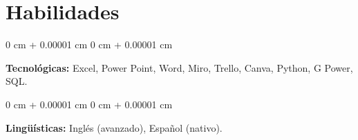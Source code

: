 \documentclass[10pt, letterpaper]{article}
\newenvironment{onecolentry}{
    \begin{adjustwidth}{
        0 cm + 0.00001 cm
    }{
        0 cm + 0.00001 cm
    }
}{
    \end{adjustwidth}
} %
\begin{document}
        \vspace{0.2 cm}
        
    \section{Habilidades}

        \begin{onecolentry}
            \textbf{Tecnológicas:} Excel, Power Point, Word, Miro, Trello, Canva, Python, G Power, SQL.        
        \end{onecolentry}

        \vspace{0.2 cm}

        \begin{onecolentry}
            \textbf{Lingüísticas:} Inglés (avanzado), Español (nativo).
        \end{onecolentry}
\end{document}
